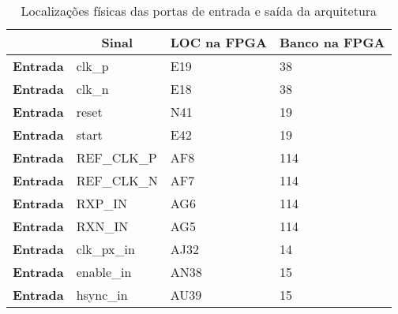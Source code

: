 \begin{table}[h!]
	\centering
	\caption{Localizações físicas das portas de entrada e saída da arquitetura}
	\label{table:LOC_simples_planE}
	\begin{tabular}{rlll}
		\hline
		\multicolumn{1}{l}{}                  & \multicolumn{1}{c}{\textbf{Sinal}}     & \multicolumn{1}{c}{\textbf{LOC na FPGA}} & \multicolumn{1}{c}{\textbf{Banco na FPGA}} \\ \hline
		\multicolumn{1}{r|}{\textbf{Entrada}} & clk\_p                                 & E19                                      & 38                                         \\
		\multicolumn{1}{r|}{\textbf{Entrada}} & clk\_n                                 & E18                                      & 38                                         \\
		\multicolumn{1}{r|}{\textbf{Entrada}} & reset                                  & N41                                      & 19                                         \\
		\multicolumn{1}{r|}{\textbf{Entrada}} & start                                  & E42                                      & 19                                         \\
		\multicolumn{1}{r|}{\textbf{Entrada}} & REF\_CLK\_P                            & AF8                                      & 114                                        \\
		\multicolumn{1}{r|}{\textbf{Entrada}} & REF\_CLK\_N                            & AF7                                      & 114                                        \\
		\multicolumn{1}{r|}{\textbf{Entrada}} & RXP\_IN                                & AG6                                      & 114                                        \\
		\multicolumn{1}{r|}{\textbf{Entrada}} & RXN\_IN                                & AG5                                      & 114                                        \\
		\multicolumn{1}{r|}{\textbf{Entrada}} & clk\_px\_in                            & AJ32                                     & 14                                         \\
		\multicolumn{1}{r|}{\textbf{Entrada}} & enable\_in                             & AN38                                     & 15                                         \\
		\multicolumn{1}{r|}{\textbf{Entrada}} & hsync\_in                              & AU39                                     & 15                                         \\

\end{tabular}
\end{table}
